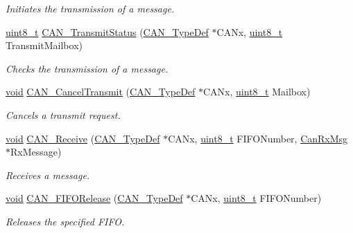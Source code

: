 \begin{DoxyCompactItemize}
\begin{DoxyCompactList}\small\item\em Initiates the transmission of a message. \end{DoxyCompactList}\item 
\hyperlink{_p_e___types_8h_aba7bc1797add20fe3efdf37ced1182c5}{uint8\+\_\+t} \hyperlink{group___c_a_n___private___functions_ga68ab05a0a6cdfcc2b6f6b6b2c10848e2}{C\+A\+N\+\_\+\+Transmit\+Status} (\hyperlink{struct_c_a_n___type_def}{C\+A\+N\+\_\+\+Type\+Def} $\ast$C\+A\+Nx, \hyperlink{_p_e___types_8h_aba7bc1797add20fe3efdf37ced1182c5}{uint8\+\_\+t} Transmit\+Mailbox)
\begin{DoxyCompactList}\small\item\em Checks the transmission of a message. \end{DoxyCompactList}\item 
\hyperlink{usb__devapi_8h_afabf60e7f57651d6d595a02c75f07cd0}{void} \hyperlink{group___c_a_n___private___functions_ga81106cdf5395a1947bfc87ec1685829e}{C\+A\+N\+\_\+\+Cancel\+Transmit} (\hyperlink{struct_c_a_n___type_def}{C\+A\+N\+\_\+\+Type\+Def} $\ast$C\+A\+Nx, \hyperlink{_p_e___types_8h_aba7bc1797add20fe3efdf37ced1182c5}{uint8\+\_\+t} Mailbox)
\begin{DoxyCompactList}\small\item\em Cancels a transmit request. \end{DoxyCompactList}\item 
\hyperlink{usb__devapi_8h_afabf60e7f57651d6d595a02c75f07cd0}{void} \hyperlink{group___c_a_n___private___functions_ga351b90bb8a3bb0c846f85bbd56ef4dc8}{C\+A\+N\+\_\+\+Receive} (\hyperlink{struct_c_a_n___type_def}{C\+A\+N\+\_\+\+Type\+Def} $\ast$C\+A\+Nx, \hyperlink{_p_e___types_8h_aba7bc1797add20fe3efdf37ced1182c5}{uint8\+\_\+t} F\+I\+F\+O\+Number, \hyperlink{struct_can_rx_msg}{Can\+Rx\+Msg} $\ast$Rx\+Message)
\begin{DoxyCompactList}\small\item\em Receives a message. \end{DoxyCompactList}\item 
\hyperlink{usb__devapi_8h_afabf60e7f57651d6d595a02c75f07cd0}{void} \hyperlink{group___c_a_n___private___functions_ga1bc3b39471e579b4101624c33d27918b}{C\+A\+N\+\_\+\+F\+I\+F\+O\+Release} (\hyperlink{struct_c_a_n___type_def}{C\+A\+N\+\_\+\+Type\+Def} $\ast$C\+A\+Nx, \hyperlink{_p_e___types_8h_aba7bc1797add20fe3efdf37ced1182c5}{uint8\+\_\+t} F\+I\+F\+O\+Number)
\begin{DoxyCompactList}\small\item\em Releases the specified F\+I\+FO. \end{DoxyCompactList}\item 

\end{DoxyCompactItemize}
